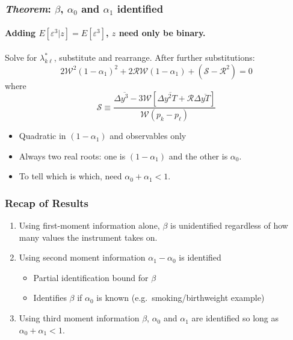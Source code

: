 \documentclass{beamer}
\begin{document}
\begin{frame}
  \frametitle{\emph{Theorem}: $\beta$, $\alpha_0$ and $\alpha_1$ identified}
  \framesubtitle{Adding $E[\varepsilon^3|z] = E[\varepsilon^3]$, $z$ need only be binary.}

    Solve for $\lambda^*_{k\ell}$, substitute and rearrange.
    After further substitutions:
  \begin{equation*}
    2\mathcal{W}^2 (1-\alpha_1)^2 + 2 \mathcal{R}\mathcal{W} (1-\alpha_1) + (\mathcal{S} -\mathcal{R}^2) = 0
  \end{equation*}
  where
  \begin{equation*}
    \mathcal{S} \equiv \frac{\Delta\overline{y^3} - 3 \mathcal{W}\left[ \Delta\overline{y^2T}+\mathcal{R}\Delta\overline{yT} \right]}{\mathcal{W}(p_k - p_\ell)}
  \end{equation*}

  \begin{itemize}
    \item Quadratic in $(1-\alpha_1)$ and observables only
    \item Always two real roots: one is $(1-\alpha_1)$ and the other is $\alpha_0$.
    \item To tell which is which, need $\alpha_0 + \alpha_1 < 1$.
  \end{itemize}


\end{frame}
\begin{frame}
  \frametitle{Recap of Results}
  \begin{enumerate}
    \item Using first-moment information alone, $\beta$ is unidentified regardless of how many values the instrument takes on.
     \item Using second moment information $\alpha_1 - \alpha_0$ is identified
       \begin{itemize}
         \item Partial identification bound for $\beta$
          \item Identifies $\beta$ if $\alpha_0$ is known (e.g.\ smoking/birthweight example)
       \end{itemize}
    \item Using third moment information $\beta$, $\alpha_0$ and $\alpha_1$ are identified so long as $\alpha_0 + \alpha_1 < 1$.
  \end{enumerate}
\end{frame}
\end{document}
